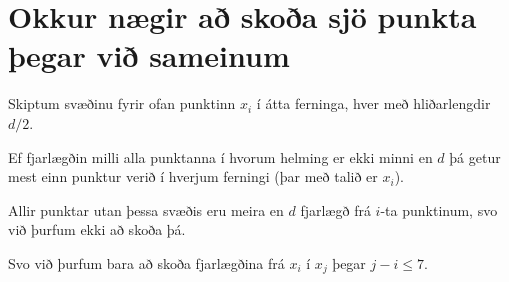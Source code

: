 \section{Okkur nægir að skoða sjö punkta þegar við sameinum}
{
    {
        \item<1-> Skiptum svæðinu fyrir ofan punktinn $x_i$ í átta ferninga, hver með hliðarlengdir $d/2$.
        \item<2-> Ef fjarlægðin milli alla punktanna í hvorum helming er ekki minni en $d$ þá getur mest einn punktur verið í hverjum ferningi
                    (þar með talið er $x_i$).
        \item<3-> Allir punktar utan þessa svæðis eru meira en $d$ fjarlægð frá $i$-ta punktinum, svo við þurfum ekki að skoða þá.
        \item<4-> Svo við þurfum bara að skoða fjarlægðina frá $x_i$ í $x_j$ þegar $j - i \leq 7$.
    }
}

